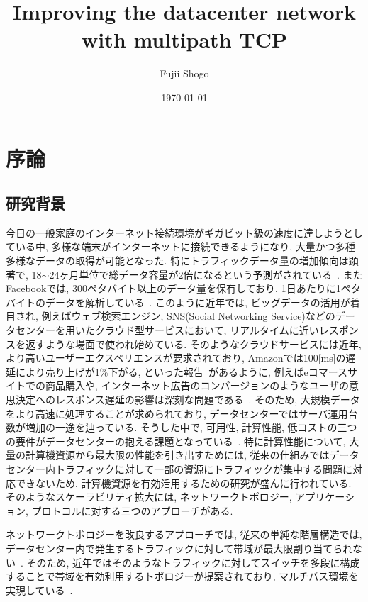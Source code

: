 \documentclass[11pt, a4paper, uplatex]{jsarticle}
\title{Improving the datacenter network with multipath TCP}
\date{\today}
\author{Fujii Shogo}
\begin{document}
%
\maketitle
\tableofcontents
\clearpage

\listoftables
\clearpage

\listoffigures
\clearpage


\section{序論}

\subsection{研究背景}
今日の一般家庭のインターネット接続環境がギガビット級の速度に達しようとしている中, 多様な端末がインターネットに接続できるようになり,
大量かつ多種多様なデータの取得が可能となった.
特にトラフィックデータ量の増加傾向は顕著で, 18$\sim$24ヶ月単位で総データ容量が2倍になるという予測がされている~\cite{IBM_rep}.
またFacebookでは, 300ペタバイト以上のデータ量を保有しており, 1日あたりに1ペタバイトのデータを解析している~\cite{presto}.
このように近年では, ビッグデータの活用が着目され, 例えばウェブ検索エンジン, SNS(Social Networking
Service)などのデータセンターを用いたクラウド型サービスにおいて, リアルタイムに近いレスポンスを返すような場面で使われ始めている.
そのようなクラウドサービスには近年, より高いユーザーエクスペリエンスが要求されており,
Amazonでは100[ms]の遅延により売り上げが1\%下がる, といった報告~\cite{amazon}があるように,
例えばeコマースサイトでの商品購入や,
インターネット広告のコンバージョンのようなユーザの意思決定へのレスポンス遅延の影響は深刻な問題である~\cite{customer_impact}.
そのため, 大規模データをより高速に処理することが求められており, データセンターではサーバ運用台数が増加の一途を辿っている.
そうした中で, 可用性, 計算性能, 低コストの三つの要件がデータセンターの抱える課題となっている~\cite{requirement}.
特に計算性能について, 大量の計算機資源から最大限の性能を引き出すためには,
従来の仕組みではデータセンター内トラフィックに対して一部の資源にトラフィックが集中する問題に対応できないため,
計算機資源を有効活用するための研究が盛んに行われている\cite{mapreduce, fattree,
dctcp, improving, detail, p_fab, synchro}.
そのようなスケーラビリティ拡大には, ネットワークトポロジー, アプリケーション, プロトコルに対する三つのアプローチがある.

ネットワークトポロジーを改良するアプローチでは, 従来の単純な階層構造では,
データセンター内で発生するトラフィックに対して帯域が最大限割り当てられない~\cite{fattree}.
そのため,
近年ではそのようなトラフィックに対してスイッチを多段に構成することで帯域を有効利用するトポロジーが提案されており,
マルチパス環境を実現している~\cite{fattree}.
\end{document}
